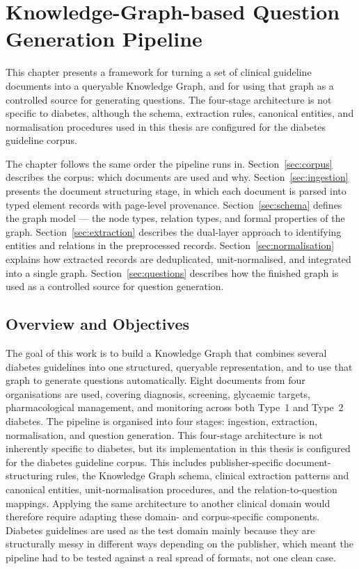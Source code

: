 \chapter{Knowledge-Graph-based Question Generation Pipeline}
\label{chap:construction}

This chapter presents a framework for turning a set of clinical guideline documents into a queryable Knowledge Graph, and for using that graph as a controlled source for generating questions. The four-stage architecture is not specific to diabetes, although the schema, extraction rules, canonical entities, and normalisation procedures used in this thesis are configured for the diabetes guideline corpus.

The chapter follows the same order the pipeline runs in. Section~\ref{sec:corpus} describes the corpus: which documents are used and why. Section~\ref{sec:ingestion} presents the document structuring stage, in which each document is parsed into typed 
element records with page-level provenance. Section~\ref{sec:schema} 
defines the graph model — the node types, relation types, and 
formal properties of the graph. Section~\ref{sec:extraction} 
describes the dual-layer approach to identifying entities and 
relations in the preprocessed records. Section~\ref{sec:normalisation} 
explains how extracted records are deduplicated, unit-normalised, 
and integrated into a single graph. Section~\ref{sec:questions} 
describes how the finished graph is used as a controlled source 
for question generation.

\section{Overview and Objectives}
\label{sec:overview}

The goal of this work is to build a Knowledge Graph that combines several diabetes guidelines into one structured, queryable representation, and to use that graph to generate questions automatically. Eight documents from four organisations are used, covering diagnosis, screening, glycaemic targets, pharmacological management, and monitoring across both Type~1 and Type~2 diabetes. The pipeline is organised into four stages: ingestion, extraction, normalisation, and question generation. This four-stage architecture is not inherently specific to diabetes, but its implementation in this thesis is configured for the diabetes guideline corpus. This includes publisher-specific document-structuring rules, the Knowledge Graph schema, clinical extraction patterns and canonical entities, unit-normalisation procedures, and the relation-to-question mappings. Applying the same architecture to another clinical domain would therefore require adapting these domain- and corpus-specific components. Diabetes guidelines are used as the test domain mainly because they are structurally messy in different ways depending on the publisher, which meant the pipeline had to be tested against a real spread of formats, not one clean case.

